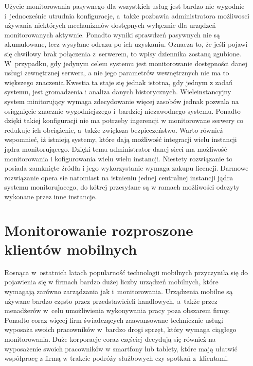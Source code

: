 
Użycie monitorowania pasywnego dla wszystkich usług jest bardzo nie
wygodnie i~jednocześnie utrudnia konfiguracje, a~także pozbawia
administratora możliwosci używania niektórych mechanizmów dostępnych
wyłącznie dla urządzeń monitorowanych aktywnie. Ponadto wyniki
sprawdzeń pasywnych nie są akumulowane, lecz wysyłane odrazu po ich
uzyskaniu. Oznacza to, że jeśli pojawi się chwilowy brak połączenia
z~serwerem, to wpisy dziennika zostaną zgubione. W~przypadku, gdy
jedynym celem systemu jest monitorowanie dostępności danej usługi
zewnętrznej serwera, a nie jego parametrów wewnętrznych nie ma to
większego znaczenia.Kwestia ta staje się jednak istotna, gdy jednym z
zadań systemu, jest gromadzenia i analiza danych
historycznych. Wieleinstancyjny system minitorujący wymaga
zdecydowanie więcej zasobów jednak pozwala na osiągnięcie znacznie
wygodniejszego i~bardziej niezawodnego systemu. Ponadto dzięki takiej
konfiguracji nie ma potrzeby ingerencji w monitorowane serwery co
redukuje ich obciążenie, a~także zwiększa bezpieczeństwo. Warto
również wspomnieć, iż istnieją systemy, które dają możliwość
integracji wielu instancji jądra monitorującego. Dzięki temu
administrator danej sieci ma możliwość monitorowania i kofigurowania
wielu wielu instancji. Niestety rozwiązanie to posiada zamknięte
źródła i jego wykorzystanie wymaga zakupu licencji. Darmowe
rozwiązanie opera sie natomiast na istnieniu jednej centralnej
instancji jądra systemu monitorujacego, do kótrej przesyłane są w
ramach możliwości odczyty wykonane przez inne instancje.

\section[Monitorowanie rozproszone][Monitorowanie rozproszone klientów
mobilnych]{Monitorowanie rozproszone klientów mobilnych}


Rosnąca w~ostatnich latach popularność technologii mobilnych
przyczyniła się do pojawienia się w firmach bardzo dużej liczby
urządzeń mobilnych, które wymagają zarówno zarządzania jak
i~monitorowania. Urządzenia mobilne są używane bardzo często przez
przedstawicieli handlowych, a~także przez menadżerów w~celu
umożliwienia wykonywania pracy poza obszarem firmy. Ponadto coraz
więcej firm świadczących zaawansowane technicznie usługi wyposaża
swoich pracowników w~bardzo drogi sprzęt, który wymaga ciągłego
monitorowania. Duże korporacje coraz częściej decydują się również na
wyposażenie swoich pracowników w smartfony lub tablety, które mają
ułatwić współpracę z firmą w trakcie podróży służbowych czy spotkań
z~klientami.

